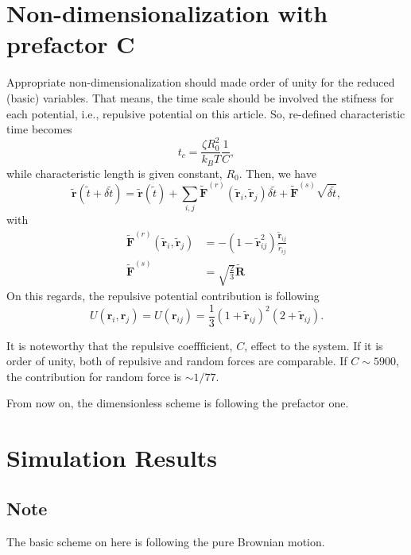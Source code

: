 \documentclass[10pt, a4paper]{report}
\begin{document}
\section{Non-dimensionalization with prefactor C}
Appropriate non-dimensionalization should made order of unity for the reduced (basic) variables. That means, the time scale should be involved the stifness for each potential, i.e., repulsive potential on this article. So, re-defined characteristic time becomes
\begin{equation}
t_c = \frac{\zeta R_0^2}{k_BT}\frac{1}{C},\label{eq:characteristic_time_C}
\end{equation}
while characteristic length is given constant, $R_0$.
Then, we have
\begin{equation}
\tilde{\mathbf{r}}(\tilde{t} + \delta \tilde{t}) = \tilde{\mathbf{r}}(\tilde{t}) + \sum_{i,j}\tilde{\mathbf{F}}^{(r)}(\tilde{\mathbf{r}}_i, \tilde{\mathbf{r}}_j)\delta \tilde{t} + \tilde{\mathbf{F}}^{(s)}\sqrt{\delta\tilde{t}},
\end{equation}
with
\begin{align}
\tilde{\mathbf{F}}^{(r)}(\tilde{\mathbf{r}}_i, \tilde{\mathbf{r}}_j) &= -\left(1-\tilde{\mathbf{r}}_{ij}^2\right)\frac{\tilde{\mathbf{r}}_{ij}}{\tilde{r}_{ij}}\\
\tilde{\mathbf{F}}^{(s)} &= \sqrt{\frac{2}{3}}\tilde{\mathbf{R}}
\end{align}
On this regards, the repulsive potential contribution is following
\begin{equation}
U(\mathbf{r}_i, \mathbf{r}_j) = U(\mathbf{r}_{ij}) = \frac{1}{3}\left(1 + \tilde{\mathbf{r}}_{ij}\right)^2(2 + \tilde{\mathbf{r}}_{ij}).
\end{equation}

It is noteworthy that the repulsive coeffficient, $C$, effect to the system. If it is order of unity, both of repulsive and random forces are comparable. If $C\sim 5900$, the contribution for random force is $\sim 1/77$.

From now on, the dimensionless scheme is following the prefactor one.

\section{Simulation Results}
\subsection{Note}
The basic scheme on here is following the pure Brownian motion. 
\end{document}
